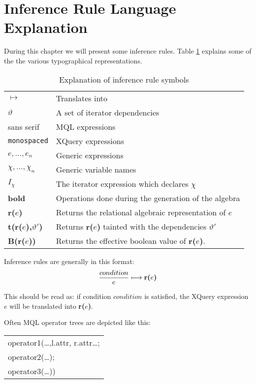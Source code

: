 \section{Inference Rule Language Explanation}
\label{sect:trans:TD:langExpl}
During this chapter we will present some inference rules. Table \ref{tab:trans:td:langExpl} explains some of the
the various typographical representations.

\begin{table}[h]
\centering
\begin{tabular}{l|l}

  $\longmapsto$  			& Translates into \\
  $\vartheta$ 				& A set of iterator dependencies \\
  \textsf{sans serif} 		& MQL expressions \\
  \texttt{monospaced} 		& XQuery expressions \\
  $e,\ldots,e_{n}$			& Generic expressions \\
  $\chi,\ldots,\chi_{n}$	& Generic variable names \\
  $I_{\chi}$				& The iterator expression which declares $\chi$ \\
  \textbf{bold} 			& Operations done during the generation of the algebra \\
  \textbf{r(}$e$\textbf{)} 	& Returns the relational algebraic representation of $e$   \\
  \textbf{t(}\textbf{r(}$e$\textbf{)}\textbf{,}$\vartheta'$\textbf{)} & Returns \textbf{r(}$e$\textbf{)} tainted
  with the dependencies $\vartheta'$ \\
  \textbf{B(r(}$e$\textbf{))} & Returns the effective boolean value of \textbf{r(}$e$\textbf{)}.
  
\end{tabular}
\caption{Explanation of inference rule symbols}
\label{tab:trans:td:langExpl}
\end{table}

Inference rules are generally in this format:
\begin{equation*}
\frac{condition}{e}\longmapsto \mbox{\textbf{r(}}e\mbox{\textbf{)}}
\end{equation*}

This should be read as: if condition $condition$ is satisfied, the XQuery expression $e$ will be translated into
\textbf{r(}$e$\textbf{)}.

Often MQL operator trees are depicted like this:
\begin{center}
\begin{tabular}{l}
\textsf{operator1(\ldots,l.attr, r.attr\ldots; } \\ \quad
\textsf{operator2(\ldots);} \\ \quad
\textsf{operator3(\ldots))}
\end{tabular}
\end{center}

